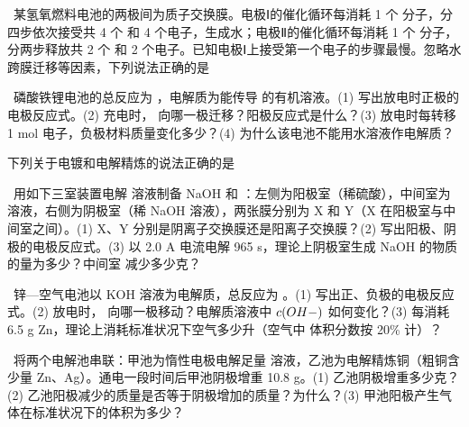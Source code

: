 \begin{xiti}
\item {}\ 某氢氧燃料电池的两极间为质子交换膜。电极Ⅰ的催化循环每消耗 1 个  分子，分四步依次接受共 4 个  和 4 个电子，生成水；电极Ⅱ的催化循环每消耗 1 个  分子，分两步释放共 2 个  和 2 个电子。已知电极Ⅰ上接受第一个电子的步骤最慢。忽略水跨膜迁移等因素，下列说法正确的是\xz
{}

\item {}\ 磷酸铁锂电池的总反应为 ，电解质为能传导  的有机溶液。(1) 写出放电时正极的电极反应式。(2) 充电时， 向哪一极迁移？阳极反应式是什么？(3) 放电时每转移 1 mol 电子，负极材料质量变化多少？(4) 为什么该电池不能用水溶液作电解质？

\item 下列关于电镀和电解精炼的说法正确的是\xz
{}

\item {}\ 用如下三室装置电解  溶液制备 NaOH 和 ：左侧为阳极室（稀硫酸），中间室为  溶液，右侧为阴极室（稀 NaOH 溶液），两张膜分别为 X 和 Y（X 在阳极室与中间室之间）。(1) X、Y 分别是阴离子交换膜还是阳离子交换膜？(2) 写出阳极、阴极的电极反应式。(3) 以 2.0 A 电流电解 965 s，理论上阴极室生成 NaOH 的物质的量为多少？中间室  减少多少克？

\item {}\ 锌—空气电池以 KOH 溶液为电解质，总反应为 。(1) 写出正、负极的电极反应式。(2) 放电时， 向哪一极移动？电解质溶液中 $c(OH-)$ 如何变化？(3) 每消耗 6.5 g Zn，理论上消耗标准状况下空气多少升（空气中  体积分数按 20\% 计）？

\item {}\ 将两个电解池串联：甲池为惰性电极电解足量  溶液，乙池为电解精炼铜（粗铜含少量 Zn、Ag）。通电一段时间后甲池阴极增重 10.8 g。(1) 乙池阴极增重多少克？(2) 乙池阳极减少的质量是否等于阴极增加的质量？为什么？(3) 甲池阳极产生气体在标准状况下的体积为多少？
\end{xiti}

